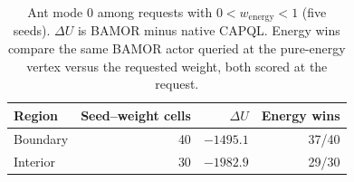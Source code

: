 \begin{table}[!htbp]
\centering\small\setlength{\tabcolsep}{4.5pt}
\caption{Ant mode 0 among requests with $0 < w_{\mathrm{energy}} < 1$ (five seeds). $\Delta U$ is BAMOR minus native CAPQL. Energy wins compare the same BAMOR actor queried at the pure-energy vertex versus the requested weight, both scored at the request.}
\label{tab:ant_geometry}
\begin{tabular}{@{}lrrr@{}}
\toprule
Region & Seed--weight cells & $\Delta U$ & Energy wins \\
\midrule
Boundary & 40 & $-1495.1$ & 37/40 \\
Interior & 30 & $-1982.9$ & 29/30 \\
\bottomrule
\end{tabular}
\end{table}
